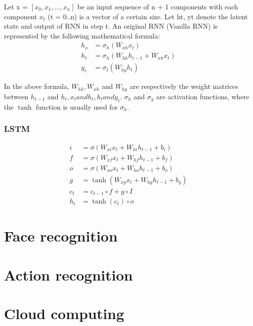 Let x = $[x_{0}, x_{1}, ..., x_{n}]$ be an input sequence of n + 1 components with each component $x_{t}$ (t = 0..n) is a vector of a certain size. Let ht, yt denote the latent state and output of RNN in step t. An original RNN (Vanilla RNN) is represented by the following mathematical formula:
\begin{align}
h_{o} &= \sigma_{h}(W_{xh}x_{t})\\
h_{t} &= \sigma_{h}(W_{hh}h_{t-1} + W_{xh}x_{t})\\
y_{t} &= \sigma_{t}(W_{hy}h_{t})
\end{align}

In the above formula, $W_{hh}, W_{xh}$ and $W_{hy}$ are respectively the weight matrices between $h_{t-1}$ and $h_{t}, x_{t} and h_{t}, h_{t} and y_{t}$. $\sigma_{h}$ and $\sigma_{y}$ are activation functions, where the $\tanh$ function is usually used for $\sigma_{h}$.
\subsubsection{LSTM}
\begin{align}
i &= \sigma ( W_{xi}x_{t} + W _{hi}h _{t-1} + b _{i}) \\
f &= \sigma(W_{xf}x_{t} + W_{hf}h_{t-1} + b_{f}) \\
o &= \sigma(W_{xo}x_{t} + W_{ho}h_{t-1} + b_{o})	\\
g &= \tanh (W_{xg}x_{t} + W_{hg}h_{t-1} + b_{g})	\\
c_{t} &= c_{t-1} \circ f+ g \circ I	\\
h_{t} &= \tanh(c_{t}) \circ o
\end{align}

\section{Face recognition}
\section{Action recognition}
\section{Cloud computing}
